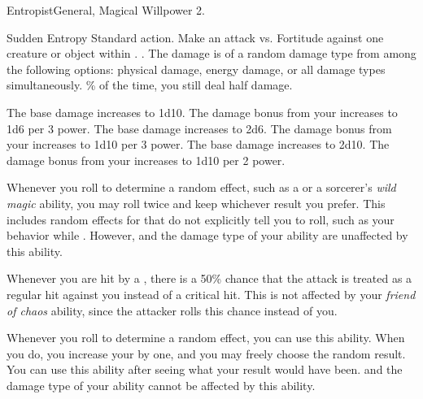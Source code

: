     \begin{magicalfeat}{Entropist}{General, Magical}
        \featpre Willpower 2.

        \begin{magicalactiveability}{Sudden Entropy}
            \abilityusagetime Standard action.
            \rankline
            Make an attack vs. Fortitude against one creature or object within \shortrange.
            \hit \damageranktwo{}.
            The damage is of a random damage type from among the following options: physical damage, energy damage, or all damage types simultaneously.
            \% of the time, you still deal half damage.

            \rankline
             The base damage increases to 1d10.
             The damage bonus from your  increases to 1d6 per 3 power.
             The base damage increases to 2d6.
             The damage bonus from your  increases to 1d10 per 3 power.
             The base damage increases to 2d10.
             The damage bonus from your  increases to 1d10 per 2 power.
        \end{magicalactiveability}

         Whenever you roll to determine a random effect, such as a  or a sorcerer's \textit{wild magic} ability, you may roll twice and keep whichever result you prefer.
        This includes random effects for that do not explicitly tell you to roll, such as your behavior while \confused.
        However,  and the damage type of your  ability are unaffected by this ability.

         Whenever you are hit by a , there is a 50\% chance that the attack is treated as a regular hit against you instead of a critical hit.
        This is not affected by your \textit{friend of chaos} ability, since the attacker rolls this chance instead of you.

         Whenever you roll to determine a random effect, you can use this ability.
        When you do, you increase your  by one, and you may freely choose the random result.
        You can use this ability after seeing what your result would have been.
         and the damage type of your  ability cannot be affected by this ability.
    \end{magicalfeat}

